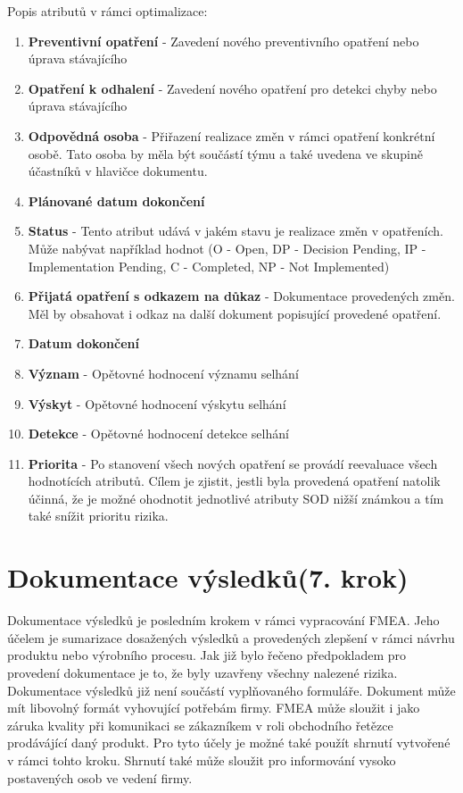 Popis atributů v rámci optimalizace:
\begin{enumerate}
	\item \textbf{Preventivní opatření} - Zavedení nového preventivního opatření nebo úprava stávajícího
	\item \textbf{Opatření k odhalení} - Zavedení nového opatření pro detekci chyby nebo úprava stávajícího
	\item \textbf{Odpovědná osoba} - Přiřazení realizace změn v rámci opatření konkrétní osobě. Tato osoba by měla být součástí týmu a také uvedena ve skupině účastníků v hlavičce dokumentu.
	\item \textbf{Plánované datum dokončení}
	\item \textbf{Status} - Tento atribut udává v jakém stavu je realizace změn v opatřeních. Může nabývat například hodnot (O - Open, DP - Decision Pending, IP - Implementation Pending, C - Completed, NP - Not Implemented)
	\item \textbf{Přijatá opatření s odkazem na důkaz} - Dokumentace provedených změn. Měl by obsahovat i odkaz na další dokument popisující provedené opatření. 
	\item \textbf{Datum dokončení} 
	\item \textbf{Význam} - Opětovné hodnocení významu selhání
	\item \textbf{Výskyt} - Opětovné hodnocení výskytu selhání
	\item \textbf{Detekce} - Opětovné hodnocení detekce selhání
	\item \textbf{Priorita} - Po stanovení všech nových opatření se provádí reevaluace všech hodnotících atributů. Cílem je zjistit, jestli byla provedená opatření natolik účinná, že je možné ohodnotit jednotlivé atributy SOD nižší známkou a tím také snížit prioritu rizika. 
\end{enumerate}

\section{Dokumentace výsledků(7. krok)}
Dokumentace výsledků je posledním krokem v rámci vypracování FMEA. Jeho účelem je sumarizace dosažených výsledků a provedených zlepšení v rámci návrhu produktu nebo výrobního procesu. Jak již bylo řečeno předpokladem pro provedení dokumentace je to, že byly uzavřeny všechny nalezené rizika. Dokumentace výsledků již není součástí vyplňovaného formuláře. Dokument může mít libovolný formát vyhovující potřebám firmy. FMEA může sloužit i jako záruka kvality při komunikaci se zákazníkem v roli obchodního řetězce prodávájící daný produkt. Pro tyto účely je možné také použít shrnutí vytvořené v rámci tohto kroku. Shrnutí také může sloužit pro informování vysoko postavených osob ve vedení firmy. 
  